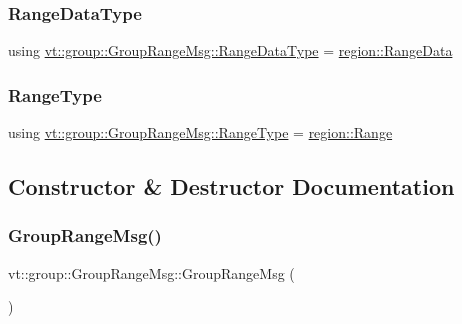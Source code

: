 \subsubsection{\texorpdfstring{Range\+Data\+Type}{RangeDataType}}
{\footnotesize\ttfamily using \hyperlink{structvt_1_1group_1_1_group_range_msg_a893386277e3598ae990bea8245aee1f3}{vt\+::group\+::\+Group\+Range\+Msg\+::\+Range\+Data\+Type} =  \hyperlink{structvt_1_1group_1_1region_1_1_range_data}{region\+::\+Range\+Data}}

\mbox{\label{structvt_1_1group_1_1_group_range_msg_a49fdcbb2ae53a4c5778e60f306c8f5e6}} 
\subsubsection{\texorpdfstring{Range\+Type}{RangeType}}
{\footnotesize\ttfamily using \hyperlink{structvt_1_1group_1_1_group_range_msg_a49fdcbb2ae53a4c5778e60f306c8f5e6}{vt\+::group\+::\+Group\+Range\+Msg\+::\+Range\+Type} =  \hyperlink{structvt_1_1group_1_1region_1_1_range}{region\+::\+Range}}



\subsection{Constructor \& Destructor Documentation}
\mbox{\label{structvt_1_1group_1_1_group_range_msg_a40399408026b4e5f866bfbf8e33ed735}} 
\subsubsection{\texorpdfstring{Group\+Range\+Msg()}{GroupRangeMsg()}\hspace{0.1cm}{\footnotesize\ttfamily [1/2]}}
{\footnotesize\ttfamily vt\+::group\+::\+Group\+Range\+Msg\+::\+Group\+Range\+Msg (\begin{DoxyParamCaption}{ }\end{DoxyParamCaption})\hspace{0.3cm}{\ttfamily [default]}}

